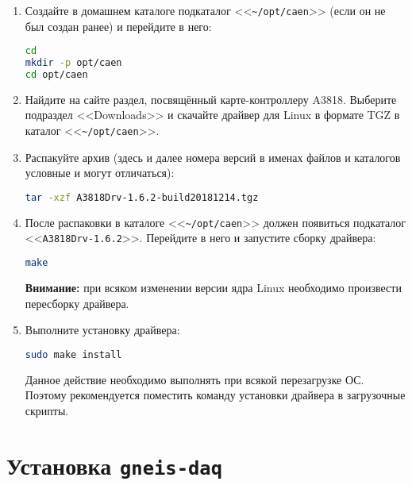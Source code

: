 \documentclass[12pt, a4paper, oneside, onecolumn]{book}
\newcommand{\GD}{{\tt gneis-daq}}
\newcommand{\DIRECTORY}[1]{<<{\tt #1}>>}
\newcommand{\NOTE}{{\bf Внимание:}}
\begin{document}
\begin{enumerate}

\item Создайте в домашнем каталоге подкаталог \DIRECTORY{\~{}/opt/caen} (если он не был создан ранее) и перейдите в него:

\begin{lstlisting}[language=bash]
cd
mkdir -p opt/caen
cd opt/caen
\end{lstlisting}

\item Найдите на сайте \cite{CaenHome} раздел, посвящённый карте-контроллеру A3818. Выберите подраздел <<Downloads>> и скачайте драйвер для Linux  в формате TGZ в каталог \DIRECTORY{\~{}/opt/caen}.

\item Распакуйте архив (здесь и далее номера версий в именах файлов и каталогов условные и могут отличаться):

\begin{lstlisting}[language=bash]
tar -xzf A3818Drv-1.6.2-build20181214.tgz
\end{lstlisting}

\item После распаковки в каталоге \DIRECTORY{\~{}/opt/caen} должен появиться подкаталог \DIRECTORY{A3818Drv-1.6.2}. Перейдите в него и запустите сборку драйвера:

\begin{lstlisting}[language=bash]
make
\end{lstlisting}

\NOTE{} при всяком изменении версии ядра Linux необходимо произвести пересборку драйвера.

\item Выполните установку драйвера:

\begin{lstlisting}[language=bash]
sudo make install
\end{lstlisting}

Данное действие необходимо выполнять при всякой перезагрузке ОС. Поэтому рекомендуется поместить команду установки драйвера в загрузочные скрипты.

\end{enumerate}

\section{Установка \GD{}}
\end{document}
